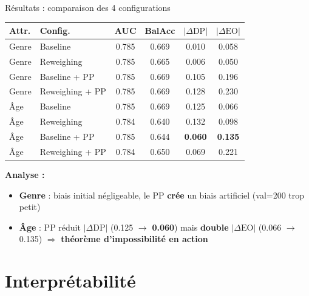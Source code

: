 \documentclass[aspectratio=169, 11pt]{beamer}
\begin{document}
\begin{frame}{R\'esultats : comparaison des 4 configurations}
\small
\begin{table}
\centering
\begin{tabular}{llcccc}
\toprule
\textbf{Attr.} & \textbf{Config.} & \textbf{AUC} & \textbf{BalAcc} & $|\Delta\text{DP}|$ & $|\Delta\text{EO}|$ \\
\midrule
Genre & Baseline          & 0.785 & 0.669 & 0.010 & 0.058 \\
Genre & Reweighing        & 0.785 & 0.665 & 0.006 & 0.050 \\
Genre & Baseline + PP     & 0.785 & 0.669 & 0.105 & 0.196 \\
Genre & Reweighing + PP   & 0.785 & 0.669 & 0.128 & 0.230 \\
\midrule
\^Age  & Baseline          & 0.785 & 0.669 & 0.125 & 0.066 \\
\^Age  & Reweighing        & 0.784 & 0.640 & 0.132 & 0.098 \\
\^Age  & Baseline + PP     & 0.785 & 0.644 & \textbf{0.060} & \textbf{0.135} \\
\^Age  & Reweighing + PP   & 0.784 & 0.650 & 0.069 & 0.221 \\
\bottomrule
\end{tabular}
\end{table}

\vspace{0.3em}
\textbf{Analyse :}
\begin{itemize}
    \item \textbf{Genre} : biais initial n\'egligeable, le PP \textbf{cr\'ee} un biais artificiel (val=200 trop petit)
    \item \textbf{\^Age} : PP r\'eduit $|\Delta\text{DP}|$ (0.125 $\to$ \textbf{0.060}) mais \textbf{double} $|\Delta\text{EO}|$ (0.066 $\to$ 0.135)
          $\Rightarrow$ \textbf{th\'eor\`eme d'impossibilit\'e en action}
\end{itemize}
\end{frame}

\section{Interpr\'etabilit\'e}
\end{document}
